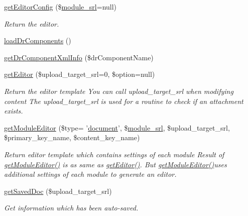 \begin{DoxyCompactItemize}
\item 
\hyperlink{classeditorModel_a66f732bbdd500d31fb39fd03eb8d46b5}{get\-Editor\-Config} (\$\hyperlink{ko_8install_8php_a370bb6450fab1da3e0ed9f484a38b761}{module\-\_\-srl}=null)
\begin{DoxyCompactList}\small\item\em Return the editor. \end{DoxyCompactList}\item 
\hyperlink{classeditorModel_a1ad866d4c1ab454b9d0b72c8d3cc29bd}{load\-Dr\-Components} ()
\item 
\hyperlink{classeditorModel_a580e31ed0fff869a97d5fe598975e960}{get\-Dr\-Component\-Xml\-Info} (\$dr\-Component\-Name)
\item 
\hyperlink{classeditorModel_a77477c0a6d333b3230f77904d96d93c5}{get\-Editor} (\$upload\-\_\-target\-\_\-srl=0, \$option=null)
\begin{DoxyCompactList}\small\item\em Return the editor template You can call upload\-\_\-target\-\_\-srl when modifying content The upload\-\_\-target\-\_\-srl is used for a routine to check if an attachment exists. \end{DoxyCompactList}\item 
\hyperlink{classeditorModel_a7870d2a76cbc33a9dbaea3f865edd313}{get\-Module\-Editor} (\$type= '\hyperlink{classdocument}{document}', \$\hyperlink{ko_8install_8php_a370bb6450fab1da3e0ed9f484a38b761}{module\-\_\-srl}, \$upload\-\_\-target\-\_\-srl, \$primary\-\_\-key\-\_\-name, \$content\-\_\-key\-\_\-name)
\begin{DoxyCompactList}\small\item\em Return editor template which contains settings of each module Result of \hyperlink{classeditorModel_a7870d2a76cbc33a9dbaea3f865edd313}{get\-Module\-Editor()} is as same as \hyperlink{classeditorModel_a77477c0a6d333b3230f77904d96d93c5}{get\-Editor()}. But \hyperlink{classeditorModel_a7870d2a76cbc33a9dbaea3f865edd313}{get\-Module\-Editor()}uses additional settings of each module to generate an editor. \end{DoxyCompactList}\item 
\hyperlink{classeditorModel_af9c4c2f7ba2d377b087cac08412b0baa}{get\-Saved\-Doc} (\$upload\-\_\-target\-\_\-srl)
\begin{DoxyCompactList}\small\item\em Get information which has been auto-\/saved. \end{DoxyCompactList}\item 

\end{DoxyCompactItemize}
